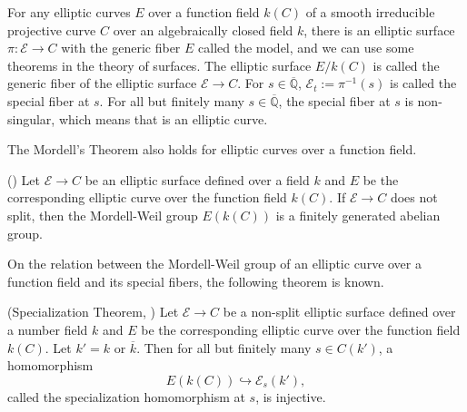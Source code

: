 \documentclass[main]{subfiles}
\begin{document}
For any elliptic curves $E$ over a function field $k(C)$ of a smooth irreducible projective curve $C$ over an algebraically closed field $k$, there is an elliptic surface $\pi: \mathcal{E} \to C$ with the generic fiber $E$ called the \Neron{} model, and we can use some theorems in the theory of surfaces.
The elliptic surface $E/k(C)$ is called the generic fiber of the elliptic surface $\mathcal{E} \to C$.
For $s \in \overline{\mathbb{Q}}$, $\mathcal{E}_t:=\pi^{-1}(s)$ is called the special fiber at $s$.
For all but finitely many $s \in \overline{\mathbb{Q}}$, the special fiber at $s$ is non-singular, which means that is an elliptic curve.

The Mordell's Theorem also holds for elliptic curves over a function field.
\begin{thm}{(\cite[Theorem 6.1.]{ref:advancedaec})}
    \label{thm:mordell_function_field}
    Let $\mathcal{E} \to C$ be an elliptic surface defined over a field $k$ and $E$ be the corresponding elliptic curve over the function field $k(C)$.
    If $\mathcal{E} \to C$ does not split, then the Mordell-Weil group $E(k(C))$ is a finitely generated abelian group.
\end{thm}

On the relation between the Mordell-Weil group of an elliptic curve over a function field and its special fibers, the following theorem is known.
\begin{thm}{(Specialization Theorem, \cite[Theorem 11.4.]{ref:advancedaec})}
    \label{thm:specialization}
    Let $\mathcal{E} \to C$ be a non-split elliptic surface defined over a number field $k$ and $E$ be the corresponding elliptic curve over the function field $k(C)$.
    Let $k'=k$ or $\overline{k}$.
    Then for all but finitely many $s \in C(k')$, a homomorphism
    \begin{equation*}
        E(k(C)) \hookrightarrow \mathcal{E}_{s}(k'),
    \end{equation*}
    called the specialization homomorphism at $s$, is injective.
\end{thm}
\end{document}
